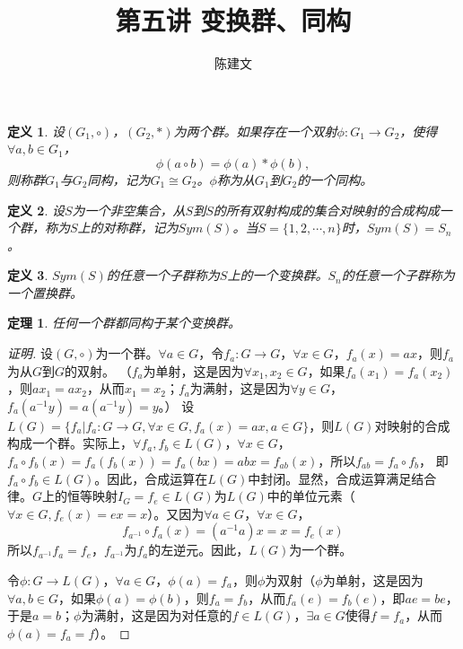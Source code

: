 \documentclass{article}
\newtheorem{Def}{定义}
\newtheorem{Thm}{定理}
\begin{document}
\begin{CJK*}{UTF8}{gbsn}
  \title{第五讲 变换群、同构}
  \author{陈建文}
  \maketitle
  \begin{Def}
    设$(G_1,\circ)$，$(G_2,*)$为两个群。如果存在一个双射$\phi:G_1\to G_2$，使得$\forall a,b\in G_1$，
    \[\phi(a\circ b)=\phi(a)* \phi(b),\]
    则称群$G_1$与$G_2$同构，记为$G_1\cong G_2$。$\phi$称为从$G_1$到$G_2$的一个同构。
  \end{Def}

  \begin{Def}
    设$S$为一个非空集合，从$S$到$S$的所有双射构成的集合对映射的合成构成一个群，称为$S$上的对称群，记为$Sym(S)$。当$S=\{1,2,\cdots,n\}$时，$Sym(S)=S_n$。
  \end{Def}

\begin{Def}
  $Sym(S)$的任意一个子群称为$S$上的一个变换群。$S_n$的任意一个子群称为一个置换群。
\end{Def}

\begin{Thm}
  任何一个群都同构于某个变换群。
\end{Thm}
\begin{proof}[证明]
  设$(G,\circ)$为一个群。$\forall a\in G$，令$f_a:G\to G$，$\forall x\in G$，$f_a(x)=ax$，则$f_a$为从$G$到$G$的双射。
  （$f_a$为单射，这是因为$\forall x_1,x_2\in G$，如果$f_a(x_1)=f_a(x_2)$，则$ax_1=ax_2$，从而$x_1=x_2$；$f_a$为满射，这是因为$\forall y\in G$，$f_a(a^{-1}y)=a(a^{-1}y)=y$。）
设$L(G)=\{f_a|f_a:G\to G,\forall x\in G,f_a(x)=ax,a\in G\}$，则$L(G)$对映射的合成构成一个群。实际上，$\forall f_a,f_b\in L(G)$，$\forall x\in G$，$f_a\circ f_b(x)=f_a(f_b(x))=f_a(bx)=abx=f_{ab}(x)$，所以$f_{ab}=f_a\circ f_b$，
即$f_a\circ f_b\in L(G)$。因此，合成运算在$L(G)$中封闭。显然，合成运算满足结合律。$G$上的恒等映射$I_G=f_e\in L(G)$为$L(G)$中的单位元素（$\forall x\in G,f_e(x)=ex=x$）。又因为$\forall a\in G$，$\forall x\in G$，
\[f_{a^{-1}}\circ f_a(x)=(a^{-1}a)x=x=f_e(x)\]
所以$f_{a^{-1}}f_a=f_e$，$f_{a^{-1}}$为$f_a$的左逆元。因此，$L(G)$为一个群。

令$\phi:G\to L(G)$，$\forall a\in G$，$\phi(a)=f_a$，则$\phi$为双射（$\phi$为单射，这是因为$\forall a,b\in G$，如果$\phi(a)=\phi(b)$，则$f_a=f_b$，从而$f_a(e)=f_b(e)$，即$ae=be$，于是$a=b$；$\phi$为满射，这是因为对任意的$f\in L(G)$，$\exists a\in G$使得$f=f_a$，从而$\phi(a)=f_a=f$）。


\end{proof}
\end{CJK*}
\end{document}
